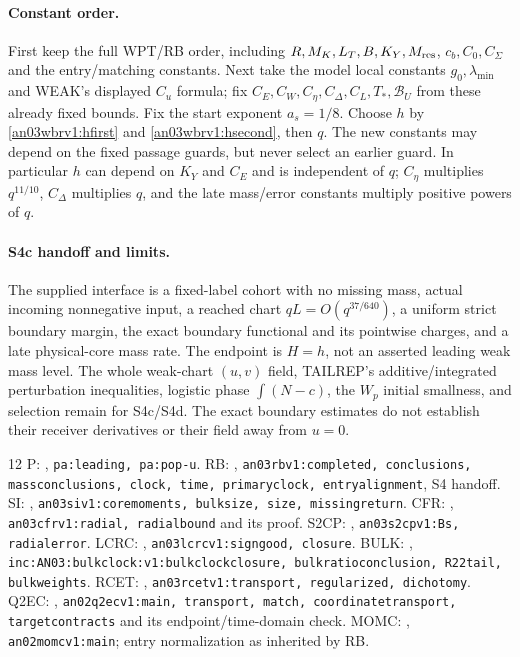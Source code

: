\documentclass[11pt]{article}
\numberwithin{equation}{section}
\theoremstyle{remark}\newtheorem{remark}[theorem]{Remark}
\begin{document}
\paragraph{Constant order.}
First keep the full WPT/RB order, including $R,M_K,L_T,B,K_Y,M_{\rm res}$,
$c_b,C_0,C_\Sigma$ and the entry/matching constants. Next take the
model local constants $g_0,\lambda_{\min}$ and WEAK's displayed
$C_u$ formula; fix $C_E,C_W,C_\eta,C_\Delta,C_L,T_*,\mathcal B_U$
from these already fixed bounds. Fix the start exponent $a_s=1/8$.
Choose $h$ by \eqref{an03wbrv1:hfirst} and
\eqref{an03wbrv1:hsecond}, then $q$. The new constants may depend
on the fixed passage guards, but never select an earlier guard.
In particular $h$ can depend on $K_Y$ and $C_E$ and is independent
of $q$; $C_\eta$ multiplies $q^{11/10}$, $C_\Delta$ multiplies $q$,
and the late mass/error constants multiply positive powers of $q$.

\paragraph{S4c handoff and limits.}
The supplied interface is a fixed-label cohort with no missing mass,
actual incoming nonnegative input, a reached chart
$qL=O(q^{37/640})$, a uniform strict boundary margin,
the exact boundary functional and its pointwise charges, and a late
physical-core mass rate. The endpoint is $H=h$, not an asserted
leading weak mass level. The whole weak-chart $(u,v)$ field,
TAILREP's additive/integrated perturbation inequalities, logistic
phase $\int(N-c)$, the $W_p$ initial smallness, and selection remain
for S4c/S4d. The exact boundary estimates do not establish their
receiver derivatives or their field away from $u=0$.

\begin{thebibliography}{12}\small
{} P: ,
\texttt{pa:leading, pa:pop-u}.
 RB: ,
\texttt{an03rbv1:completed, conclusions, massconclusions, clock,
time, primaryclock, entryalignment}, S4 handoff.
 SI: ,
\texttt{an03siv1:coremoments, bulksize, size, missingreturn}.
 CFR: ,
\texttt{an03cfrv1:radial, radialbound} and its proof.
 S2CP: ,
\texttt{an03s2cpv1:Bs, radialerror}.
 LCRC: ,
\texttt{an03lcrcv1:signgood, closure}.
 BULK: ,
\texttt{inc:AN03:bulkclock:v1:bulkclockclosure, bulkratioconclusion,
R22tail, bulkweights}.
 RCET: ,
\texttt{an03rcetv1:transport, regularized, dichotomy}.
 Q2EC: ,
\texttt{an02q2ecv1:main, transport, match, coordinatetransport,
targetcontracts} and its endpoint/time-domain check.
 MOMC: ,
\texttt{an02momcv1:main}; entry normalization as inherited by RB.
\end{thebibliography}
\end{document}
